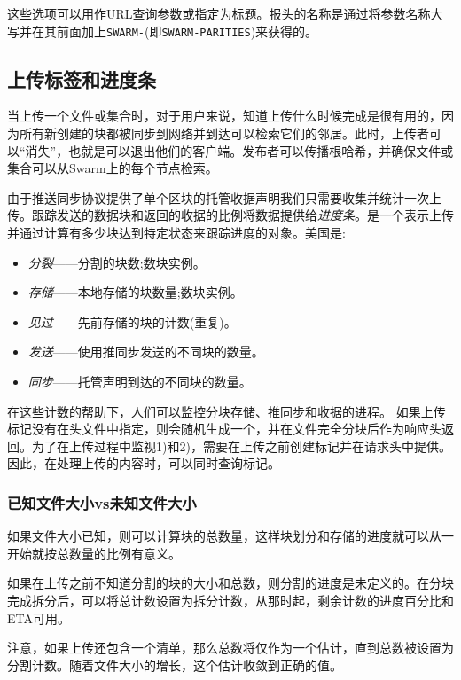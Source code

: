 这些选项可以用作URL查询参数或指定为标题。报头的名称是通过将参数名称大写并在其前面加上\lstinline{SWARM-}(即\lstinline{SWARM-PARITIES})来获得的。  


\subsection{上传标签和进度条\statusgreen}\label{sec:tags}                                                                                        
当上传一个文件或集合时，对于用户来说，知道上传什么时候完成是很有用的，因为所有新创建的块都被同步到网络并到达可以检索它们的邻居。此时，上传者可以“消失”，也就是可以退出他们的客户端。发布者可以传播根哈希，并确保文件或集合可以从Swarm上的每个节点检索。 

由于推送同步协议提供了单个区块的托管收据声明我们只需要收集并统计一次上传。跟踪发送的数据块和返回的收据的比例将数据提供给\emph{进度条}。是一个表示上传并通过计算有多少块达到特定状态来跟踪进度的对象。美国是: 

\begin{itemize}
\item \emph{分裂}——分割的块数;数块实例。
\item \emph{存储}——本地存储的块数量;数块实例。
\item \emph{见过}——先前存储的块的计数(重复)。
\item \emph{发送}——使用推同步发送的不同块的数量。
\item \emph{同步}——托管声明到达的不同块的数量。
\end{itemize}

在这些计数的帮助下，人们可以监控分块存储、推同步和收据的进程。
如果上传标记没有在头文件中指定，则会随机生成一个，并在文件完全分块后作为响应头返回。为了在上传过程中监视1)和2)，需要在上传之前创建标记并在请求头中提供。因此，在处理上传的内容时，可以同时查询标记。 

\subsubsection{已知文件大小vs未知文件大小}

如果文件大小已知，则可以计算块的总数量，这样块划分和存储的进度就可以从一开始就按总数量的比例有意义。

如果在上传之前不知道分割的块的大小和总数，则分割的进度是未定义的。在分块完成拆分后，可以将总计数设置为拆分计数，从那时起，剩余计数的进度百分比和ETA可用。

注意，如果上传还包含一个清单，那么总数将仅作为一个估计，直到总数被设置为分割计数。随着文件大小的增长，这个估计收敛到正确的值。



